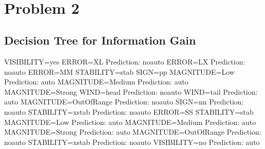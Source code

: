 \documentclass[]{article}   %
\begin{document}
 \begin{figure}[H]
    \centering
    \mbox{
        \quad{}\quad{}\quad{}}\end{figure}
 \begin{figure}[H]
    \centering
    \mbox{
        \quad{}\quad{}\quad{}}\end{figure}
 \begin{figure}[H]
    \centering
    \mbox{
        \quad{}\quad{}\quad{}}\end{figure}
 \begin{figure}[H]
    \centering
    \mbox{
        \quad{}\quad{}\quad{}}\end{figure}
\section{Problem 2}
\subsection{Decision Tree for Information Gain}
\begin{verbatimtab}[8]
  VISIBILITY=yes
    ERROR=XL
      Prediction: noauto
    ERROR=LX
      Prediction: noauto
    ERROR=MM
      STABILITY=stab
        SIGN=pp
          MAGNITUDE=Low
            Prediction: auto
          MAGNITUDE=Medium
            Prediction: auto
          MAGNITUDE=Strong
            WIND=head
              Prediction: noauto
            WIND=tail
              Prediction: auto
          MAGNITUDE=OutOfRange
            Prediction: noauto
        SIGN=nn
          Prediction: noauto
      STABILITY=xstab
        Prediction: noauto
    ERROR=SS
      STABILITY=stab
        MAGNITUDE=Low
          Prediction: auto
        MAGNITUDE=Medium
          Prediction: auto
        MAGNITUDE=Strong
          Prediction: auto
        MAGNITUDE=OutOfRange
          Prediction: noauto
      STABILITY=xstab
        Prediction: noauto
  VISIBILITY=no
    Prediction: auto
\end{verbatimtab}
\end{document}
